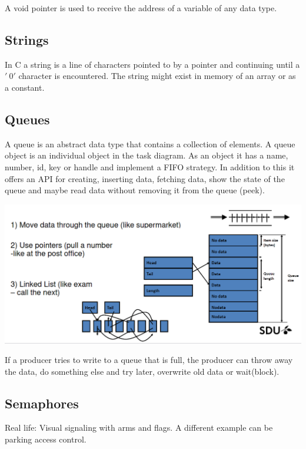 A void pointer is used to receive the address of a variable
of any data type.

\subsection{Strings}
In C a string is a line of characters pointed to by a pointer and
continuing until a $'\ 0'$ character is encountered.
The string might exist in memory of an array or as a constant.


\subsection{Queues}

A queue is an abstract data type that contains a collection of elements.
A queue object is an individual object in the task diagram.
As an object it has a name, number, id, key or handle and implement
a FIFO strategy. In addition to this it offers an API for
creating, inserting data, fetching data, show the state of the queue and
maybe read data without removing it from the queue (peek).


\begin{center}
	\includegraphics[width=\textwidth]{images/queue.png}
\end{center}

If a producer tries to write to a queue that is full, the producer
can throw away the data, do something else and try later,
overwrite old data or wait(block).



\subsection{Semaphores}

Real life: Visual signaling with arms and flags. A different example
can be parking access control.


